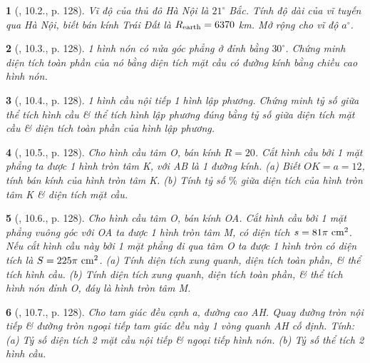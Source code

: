 \documentclass{article}
\newtheorem{baitoan}{}
\begin{document}
\begin{baitoan}[\cite{Binh_boi_duong_Toan_9_tap_2}, 10.2., p. 128]
	Vĩ độ của thủ đô Hà Nội là $21^\circ$ Bắc. Tính độ dài của vĩ tuyến qua Hà Nội, biết bán kính Trái Đất là $R_{\rm earth} = 6370$ {\rm km}. Mở rộng cho vĩ độ $a^\circ$.
\end{baitoan}

\begin{baitoan}[\cite{Binh_boi_duong_Toan_9_tap_2}, 10.3., p. 128]
	1 hình nón có nửa góc phẳng ở đỉnh bằng $30^\circ$. Chứng minh diện tích toàn phần của nó bằng diện tích mặt cầu có đường kính bằng chiều cao hình nón.
\end{baitoan}

\begin{baitoan}[\cite{Binh_boi_duong_Toan_9_tap_2}, 10.4., p. 128]
	1 hình cầu nội tiếp 1 hình lập phương. Chứng minh tỷ số giữa thể tích hình cầu \& thể tích hình lập phương đúng bằng tỷ số giữa diện tích mặt cầu \& diện tích toàn phần của hình lập phương.
\end{baitoan}

\begin{baitoan}[\cite{Binh_boi_duong_Toan_9_tap_2}, 10.5., p. 128]
	Cho hình cầu tâm O, bán kính $R = 20$. Cắt hình cầu bởi 1 mặt phẳng ta được 1 hình tròn tâm K, với AB là 1 đường kính. (a) Biết $OK = a = 12$, tính bán kính của hình tròn tâm K. (b) Tính tỷ số $\%$ giữa diện tích của hình tròn tâm K \& diện tích mặt cầu.
\end{baitoan}

\begin{baitoan}[\cite{Binh_boi_duong_Toan_9_tap_2}, 10.6., p. 128]
	Cho hình cầu tâm O, bán kính OA. Cắt hình cầu bởi 1 mặt phẳng vuông góc với OA ta được 1 hình tròn tâm M, có diện tích $s = 81\pi\ {\rm cm}^2$. Nếu cắt hình cầu này bởi 1 mặt phẳng đi qua tâm O ta được 1 hình tròn có diện tích là $S = 225\pi\ {\rm cm}^2$. (a) Tính diện tích xung quanh, diện tích toàn phần, \& thể tích hình cầu. (b) Tính diện tích xung quanh, diện tích toàn phần, \& thể tích hình nón đỉnh O, đáy là hình tròn tâm M.
\end{baitoan}

\begin{baitoan}[\cite{Binh_boi_duong_Toan_9_tap_2}, 10.7., p. 128]
	Cho tam giác đều cạnh a, đường cao AH. Quay đường tròn nội tiếp \& đường tròn ngoại tiếp tam giác đều này 1 vòng quanh AH cố định. Tính: (a) Tỷ số diện tích 2 mặt cầu nội tiếp \& ngoại tiếp hình nón. (b) Tỷ số thể tích 2 hình cầu.
\end{baitoan}
\end{document}
